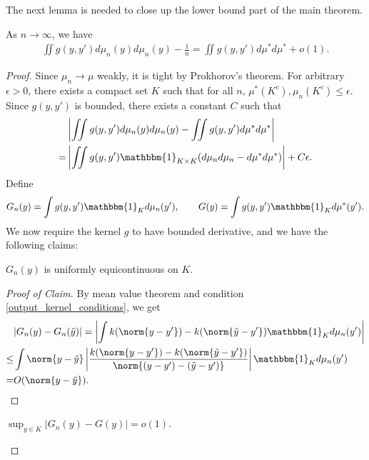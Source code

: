 The next lemma is needed to close up the lower bound part of the main theorem.
\begin{lemma} \label{output_kernel_int_lemma}
    As $n \to \infty$, we have
    \begin{align}
        \iint g(y,y')d\mu_n(y) d\mu_n(y) - \frac{1}{n} = \iint g(y,y')d\mu^* d\mu^* + o(1).
    \end{align}
\end{lemma}
\begin{proof}
    Since $\mu_n \to \mu$ weakly, it is tight by Prokhorov's theorem. For arbitrary $\epsilon >0$, there exists a compact set $K$ such that for all $n$, $\mu^*(K^c),\mu_n(K^c) \leq \epsilon$. Since $g(y,y')$ is bounded, there exists a constant $C$ such that
    \begin{align}
          & \left|\iint g(y,y')d\mu_n(y) d\mu_n(y) - \iint g(y,y')d\mu^* d\mu^*\right| \nonumber            \\
        = & \left|\iint g(y,y') \mathbbm{1}_{K \times K}(d\mu_n d\mu_n - d\mu^* d\mu^*)\right| + C\epsilon.
    \end{align}
    Define
    \begin{align}
        G_n(y) = \int g(y,y') \mathbbm{1}_K d\mu_n(y'), \qquad G(y) = \int g(y,y') \mathbbm{1}_K d\mu^*(y').
    \end{align}
    We now require the kernel $g$ to have bounded derivative, and we have the following claims:
    \begin{claim} \label{claim_1}
        $G_n(y)$ is uniformly equicontinuous on $K$.
    \end{claim}
    \begin{proof}[Proof of Claim]
        By mean value theorem and condition \ref{output_kernel_conditions}, we get
        \begin{align}
                 & |G_n(y)-G_n(\tilde{y})| = \left|\int k(\norm{y-y'}) - k(\norm{\tilde{y}-y'}) \mathbbm{1}_K d\mu_n(y')\right| \nonumber                              \\
            \leq & \int \norm{y-\tilde{y}}\left|\frac{k(\norm{y-y'}) - k(\norm{\tilde{y}-y'})}{\norm{(y-y')-(\tilde{y}-y')}} \right|\mathbbm{1}_K d\mu_n(y') \nonumber \\
            =    & O(\norm{y-\tilde{y}}).
        \end{align}
    \end{proof}
    \begin{claim} \label{claim_2}
        $\sup_{y \in K}|G_n(y)-G(y)|=o(1)$.
    \end{claim}

\end{proof}
